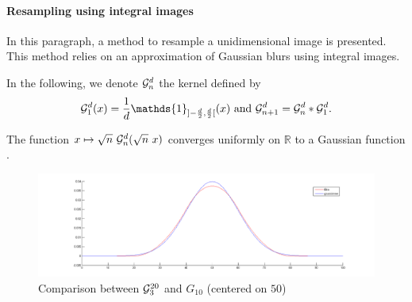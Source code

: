 


\paragraph{Resampling using integral images}
\label{4Integral}

In this paragraph, a method to resample a unidimensional image is presented. This method relies on an approximation of Gaussian blurs using integral images.%


In the following, we denote $\mathcal{G}_n^d$ the kernel defined by
\begin{equation}
\Gcal_1^d(x)=\frac{1}{d}\mathds{1}_{]-\frac{d}{2},\frac{d}{2}[}(x) \text{ and } \Gcal_{n+1}^d= \Gcal_n^d * \Gcal_1^d .
\label{formule_convol_n_int}
\end{equation}

\begin{prop}
The function $x\mapsto \sqrt{n}~\mathcal{G}_n^d(\sqrt{n}~x)$ converges uniformly on $\mathbb{R}$ to a Gaussian function .
\end{prop}


\begin{figure}
\centering
\includegraphics[width=15cm]{filtre_g3.png}
\caption{Comparison between $\mathcal{G}_3^{20}$ and $G_{10}$ (centered on $50$)}
\end{figure}

